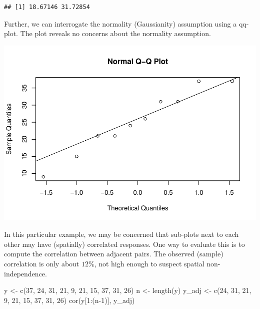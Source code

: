 \documentclass[
]{book}
\newenvironment{Shaded}{\begin{snugshade}}{\end{snugshade}}
\newcommand{\DecValTok}[1]{\textcolor[rgb]{0.00,0.00,0.81}{#1}}
\newcommand{\FunctionTok}[1]{\textcolor[rgb]{0.00,0.00,0.00}{#1}}
\newcommand{\NormalTok}[1]{#1}
\newcommand{\OtherTok}[1]{\textcolor[rgb]{0.56,0.35,0.01}{#1}}
\newcommand{\SpecialCharTok}[1]{\textcolor[rgb]{0.00,0.00,0.00}{#1}}
\begin{document}
\begin{verbatim}
## [1] 18.67146 31.72854
\end{verbatim}

Further, we can interrogate the normality (Gaussianity) assumption using a qq-plot. The plot reveals no concerns about the normality assumption.

\includegraphics{02-Intro-to-Linear-Models_files/figure-latex/unnamed-chunk-2-1.pdf}

In this particular example, we may be concerned that sub-plots next to each other may have (spatially) correlated responses. One way to evaluate this is to compute the correlation between adjacent pairs. The observed (sample) correlation is only about \(12\%\), not high enough to suspect spatial non-independence.

\begin{Shaded}
\begin{Highlighting}[]
\NormalTok{y }\OtherTok{\textless{}{-}} \FunctionTok{c}\NormalTok{(}\DecValTok{37}\NormalTok{, }\DecValTok{24}\NormalTok{, }\DecValTok{31}\NormalTok{, }\DecValTok{21}\NormalTok{,  }\DecValTok{9}\NormalTok{, }\DecValTok{21}\NormalTok{, }\DecValTok{15}\NormalTok{, }\DecValTok{37}\NormalTok{, }\DecValTok{31}\NormalTok{, }\DecValTok{26}\NormalTok{)}
\NormalTok{n }\OtherTok{\textless{}{-}} \FunctionTok{length}\NormalTok{(y)}
\NormalTok{y\_adj }\OtherTok{\textless{}{-}} \FunctionTok{c}\NormalTok{(}\DecValTok{24}\NormalTok{, }\DecValTok{31}\NormalTok{, }\DecValTok{21}\NormalTok{,  }\DecValTok{9}\NormalTok{, }\DecValTok{21}\NormalTok{, }\DecValTok{15}\NormalTok{, }\DecValTok{37}\NormalTok{, }\DecValTok{31}\NormalTok{, }\DecValTok{26}\NormalTok{)}
\FunctionTok{cor}\NormalTok{(y[}\DecValTok{1}\SpecialCharTok{:}\NormalTok{(n}\DecValTok{{-}1}\NormalTok{)], y\_adj)}
\end{Highlighting}
\end{Shaded}
\end{document}
